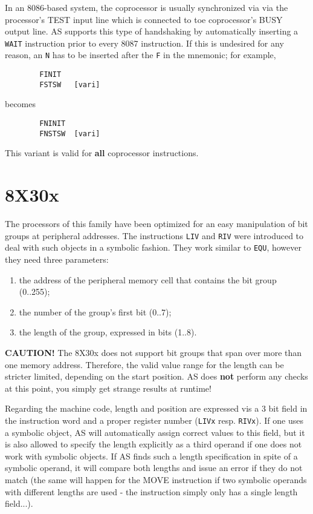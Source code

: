 \documentclass[12pt,twoside]{report}
\newcommand{\bb}[1]{{\bf #1}}
\newcommand{\tty}[1]{{\tt #1}}
\begin{document}
In an 8086-based system, the coprocessor is usually synchronized via
via the processor's TEST input line which is connected to toe
coprocessor's BUSY output line.  AS supports this type of handshaking
by automatically inserting a \tty{WAIT} instruction prior to every 8087
instruction.  If this is undesired for any reason, an \tty{N} has to be
inserted after the \tty{F} in the mnemonic; for example,
\begin{verbatim}
        FINIT            
        FSTSW   [vari]    
\end{verbatim}
becomes
\begin{verbatim}
        FNINIT           
        FNSTSW  [vari]    
\end{verbatim}
This variant is valid for \bb{all} coprocessor instructions.


\section{8X30x}
\label{8X30xSpec}

The processors of this family have been optimized for an easy manipulation
of bit groups at peripheral addresses.  The instructions \tty{LIV} and
\tty{RIV} were introduced to deal with such objects in a symbolic fashion. 
They work similar to \tty{EQU}, however they need three parameters:
\begin{enumerate}
\item{the address of the peripheral memory cell that contains the bit
     group (0..255);}
\item{the number of the group's first bit (0..7);}
\item{the length of the group, expressed in bits (1..8).}
\end{enumerate}
\bb{CAUTION!} The 8X30x does not support bit groups that span over more
than one memory address.  Therefore, the valid value range for the
length can be stricter limited, depending on the start position.  AS
does \bb{not} perform any checks at this point, you simply get strange
results at runtime!

Regarding the machine code, length and position are expressed vis a 3
bit field in the instruction word and a proper register number (\tty{LIVx}
resp. \tty{RIVx}).  If one uses a symbolic object, AS will automatically
assign correct values to this field, but it is also allowed to
specify the length explicitly as a third operand if one does not work
with symbolic objects.  If AS finds such a length specification in
spite of a symbolic operand, it will compare both lengths and issue
an error if they do not match (the same will happen for the MOVE
instruction if two symbolic operands with different lengths are used
- the instruction simply only has a single length field...).
\end{document}
